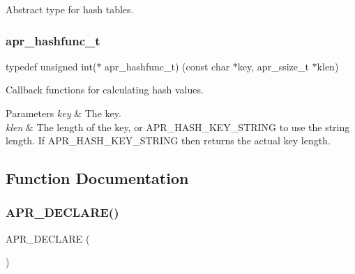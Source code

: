 Abstract type for hash tables. \mbox{\label{group__apr__hash_ga0bf5622266af13a2489c907a101cb156}} 
\subsubsection{\texorpdfstring{apr\+\_\+hashfunc\+\_\+t}{apr\_hashfunc\_t}}
{\footnotesize\ttfamily typedef unsigned int($\ast$ apr\+\_\+hashfunc\+\_\+t) (const char $\ast$key, apr\+\_\+ssize\+\_\+t $\ast$klen)}

Callback functions for calculating hash values. 
\begin{DoxyParams}{Parameters}
{\em key} & The key. \\
\hline
{\em klen} & The length of the key, or A\+P\+R\+\_\+\+H\+A\+S\+H\+\_\+\+K\+E\+Y\+\_\+\+S\+T\+R\+I\+NG to use the string length. If A\+P\+R\+\_\+\+H\+A\+S\+H\+\_\+\+K\+E\+Y\+\_\+\+S\+T\+R\+I\+NG then returns the actual key length. \\
\hline
\end{DoxyParams}


\subsection{Function Documentation}
\mbox{\label{group__apr__hash_ga090f75283396043d20ff43f05df27e2d}} 
\subsubsection{\texorpdfstring{A\+P\+R\+\_\+\+D\+E\+C\+L\+A\+R\+E()}{APR\_DECLARE()}\hspace{0.1cm}{\footnotesize\ttfamily [1/6]}}
{\footnotesize\ttfamily A\+P\+R\+\_\+\+D\+E\+C\+L\+A\+RE (\begin{DoxyParamCaption}\item[{\mbox{\hyperlink{group__apr__hash_ga72ec09b8bde6d874c36bd49df915fff6}{apr\+\_\+hash\+\_\+t}} $\ast$}]{ }\end{DoxyParamCaption})}

